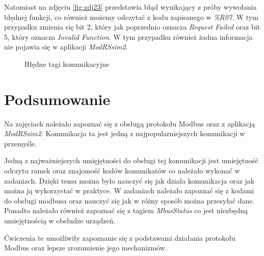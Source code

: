\documentclass{article}
\begin{document}
Natomiast na zdjęciu \ref{fig:zdj23} przedstawia błąd wynikający z próby wywołania błędnej funkcji, co również możemy odczytać z kodu zapisanego w \textit{\%R07}. W tym przypadku zmienia się bit 2, który jak poprzednio oznacza \textit{Request Failed} oraz bit 5, który oznacza \textit{Invalid Function}. W tym przypadku również żadna informacja nie pojawia się w aplikacji \textit{ModRSsim2}.



\begin{figure}[!ht]
    \centering
    \caption{Błędne tagi komunikacyjne}
    \label{fig:main2}
\end{figure}
\newpage
\section{Podsumowanie}
Na zajęciach należało zapoznać się z obsługą protokołu Modbus oraz z aplikacją \textit{ModRSsim2}. Komunikacja ta jest jedną z najpopularniejszych komunikacji w przemyśle.

Jedną z najważniejszych umięjętności do obsługi tej komunikacji jest umiejętność odczytu ramek oraz znajomość kodów komunikatów co należało wykonać w zadaniach. Dzięki temu można było nauczyć się jak działa komunikacja oraz jak można ją wykorzystać w praktyce. W zadaniach należało zapoznać się z kodami do obsługi modbusa oraz nauczyć się jak w różny sposób można przesyłać dane. Ponadto należało również zapoznać się z tagiem \textit{MbusStatus} co jest niezbędną umiejętnością w obsłudze urządzeń.

Ćwiczenia te umożliwiły zapoznanie się z podstawami działania protokołu Modbus oraz lepsze zrozumienie jego mechanizmów.
\end{document}
